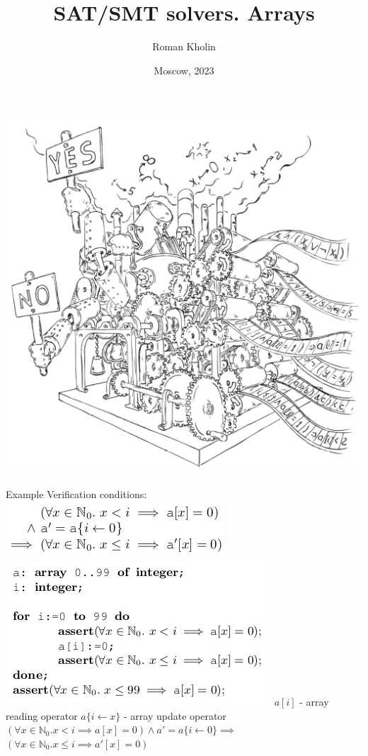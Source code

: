 \documentclass{beamer}
\begin{document}
\title{SAT/SMT solvers. Arrays}
\author{Roman Kholin}
\date{Moscow, 2023}

\begin{frame}
\includegraphics[scale=0.5]{../decision-procedure.png}
\end{frame}

\frame{\titlepage}

\begin{frame}{Example}
Verification conditions:\newline
\includegraphics[scale=0.5]{conditions.png}
\includegraphics[scale=0.5]{code.png}\newline
$a[i]$ - array reading operator\newline
$a\{i\leftarrow x\}$ - array update operator\newline
$(\forall x \in \mathbb{N}_0. x < i \implies a[x] = 0) \wedge a' = a\{i\leftarrow 0\} \implies$\newline
$(\forall x \in \mathbb{N}_0. x \le i \implies a'[x] = 0)$
\end{frame}
\end{document}
